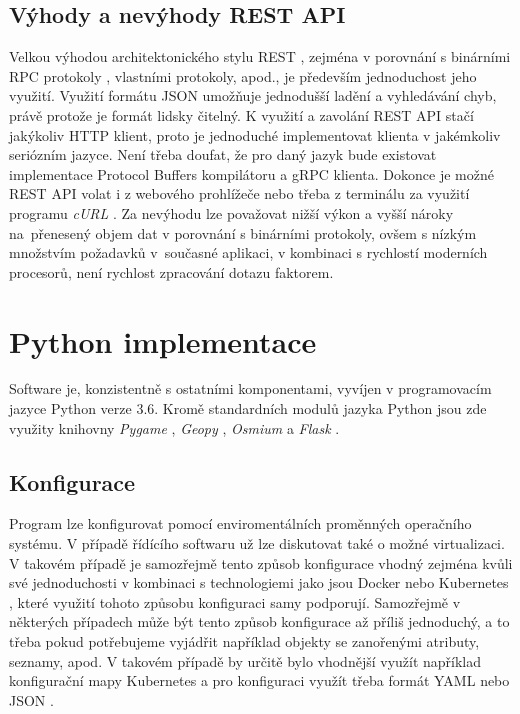 \documentclass[czech, bachelor]{diploma}
\begin{document}
\subsection{Výhody a nevýhody REST API}

Velkou výhodou architektonického stylu REST \cite{rest-source}, zejména v porovnání s binárními RPC protokoly \cite{grpc-source}, 
vlastními protokoly, apod., je především jednoduchost jeho využití. Využití formátu JSON \cite{json-source} umožňuje jednodušší
ladění a vyhledávání chyb, právě protože je formát lidsky čitelný. K využití a zavolání REST API stačí jakýkoliv HTTP 
\cite{http-source} klient, proto je jednoduché implementovat klienta v jakémkoliv seriózním jazyce. Není třeba doufat, že pro daný
jazyk bude existovat implementace Protocol Buffers \cite{protobuf-source} kompilátoru a gRPC \cite{grpc-source} klienta. Dokonce 
je možné REST API volat i z webového prohlížeče nebo třeba z terminálu za využití programu \emph{cURL} \cite{curl-source}. 
Za nevýhodu lze považovat nižší výkon a vyšší nároky na~přenesený objem dat v porovnání s binárními protokoly, ovšem s nízkým
množstvím požadavků v~současné aplikaci, v kombinaci s rychlostí moderních procesorů, není rychlost zpracování dotazu faktorem.

\section{Python implementace}

Software je, konzistentně s ostatními komponentami, vyvíjen v programovacím jazyce Python verze 3.6. Kromě standardních modulů
jazyka Python jsou zde využity knihovny \emph{Pygame} \cite{pygame-source}, \emph{Geopy} \cite{geopy-source}, \emph{Osmium}
\cite{osmium-source} a \emph{Flask} \cite{flask-source}.

\subsection{Konfigurace}

Program lze konfigurovat pomocí enviromentálních proměnných operačního systému. V případě řídícího softwaru už lze diskutovat také
o možné virtualizaci. V takovém případě je samozřejmě tento způsob konfigurace vhodný zejména kvůli své jednoduchosti v kombinaci
s technologiemi jako jsou Docker nebo Kubernetes \cite{virtualization-source}, které využití tohoto způsobu konfiguraci samy
podporují. Samozřejmě v některých případech může být tento způsob konfigurace až příliš jednoduchý, a to třeba pokud potřebujeme
vyjádřit například objekty se zanořenými atributy, seznamy, apod. V takovém případě by určitě bylo vhodnější využít například
konfigurační mapy Kubernetes a pro konfiguraci využít třeba formát YAML \cite{yaml-source} nebo JSON \cite{json-source}.
\end{document}
